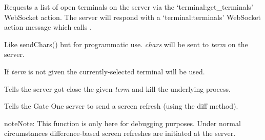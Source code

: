 \documentclass[letterpaper,10pt,openany]{sphinxmanual}
\begin{document}
\begin{fulllineitems}
\label{Applications/terminal/js_terminal:GateOne.Terminal.getOpenTerminals}
Requests a list of open terminals on the server via the `terminal:get\_terminals' WebSocket action.  The server will respond with a `terminal:terminals' WebSocket action message which calls {\hyperref[Applications/terminal/js_terminal:GateOne.Terminal.reattachTerminalsAction]{}}.

\end{fulllineitems}


\begin{fulllineitems}
\label{Applications/terminal/js_terminal:GateOne.Terminal.sendString}
Like sendChars() but for programmatic use.  \emph{chars} will be sent to \emph{term} on the server.

If \emph{term} is not given the currently-selected terminal will be used.

\end{fulllineitems}


\begin{fulllineitems}
\label{Applications/terminal/js_terminal:GateOne.Terminal.killTerminal}
Tells the server got close the given \emph{term} and kill the underlying process.

\end{fulllineitems}


\begin{fulllineitems}
\label{Applications/terminal/js_terminal:GateOne.Terminal.refresh}
Tells the Gate One server to send a screen refresh (using the diff method).

\begin{notice}{note}{Note:}
This function is only here for debugging purposes.  Under normal circumstances difference-based screen refreshes are initiated at the server.
\end{notice}

\end{fulllineitems}
\end{document}

